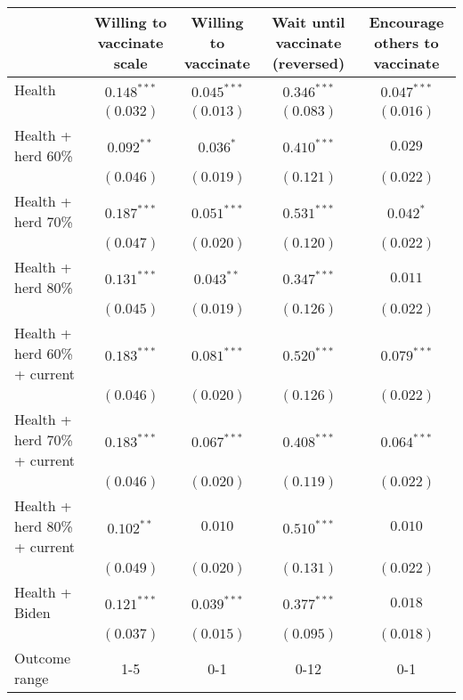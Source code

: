 \begin{table}
\begin{center}
\begin{tabular}{l c c c c}
\hline
 & Willing to vaccinate scale & Willing to vaccinate & Wait until vaccinate (reversed) & Encourage others to vaccinate \\
\hline
Health                       & $0.148^{***}$ & $0.045^{***}$ & $0.346^{***}$ & $0.047^{***}$ \\
                             & $(0.032)$     & $(0.013)$     & $(0.083)$     & $(0.016)$     \\
Health + herd 60\%           & $0.092^{**}$  & $0.036^{*}$   & $0.410^{***}$ & $0.029$       \\
                             & $(0.046)$     & $(0.019)$     & $(0.121)$     & $(0.022)$     \\
Health + herd 70\%           & $0.187^{***}$ & $0.051^{***}$ & $0.531^{***}$ & $0.042^{*}$   \\
                             & $(0.047)$     & $(0.020)$     & $(0.120)$     & $(0.022)$     \\
Health + herd 80\%           & $0.131^{***}$ & $0.043^{**}$  & $0.347^{***}$ & $0.011$       \\
                             & $(0.045)$     & $(0.019)$     & $(0.126)$     & $(0.022)$     \\
Health + herd 60\% + current & $0.183^{***}$ & $0.081^{***}$ & $0.520^{***}$ & $0.079^{***}$ \\
                             & $(0.046)$     & $(0.020)$     & $(0.126)$     & $(0.022)$     \\
Health + herd 70\% + current & $0.183^{***}$ & $0.067^{***}$ & $0.408^{***}$ & $0.064^{***}$ \\
                             & $(0.046)$     & $(0.020)$     & $(0.119)$     & $(0.022)$     \\
Health + herd 80\% + current & $0.102^{**}$  & $0.010$       & $0.510^{***}$ & $0.010$       \\
                             & $(0.049)$     & $(0.020)$     & $(0.131)$     & $(0.022)$     \\
Health + Biden               & $0.121^{***}$ & $0.039^{***}$ & $0.377^{***}$ & $0.018$       \\
                             & $(0.037)$     & $(0.015)$     & $(0.095)$     & $(0.018)$     \\
\hline
Outcome range                & 1-5           & 0-1           & 0-12          & 0-1           \\

\end{tabular}
\end{center}
\end{table}
